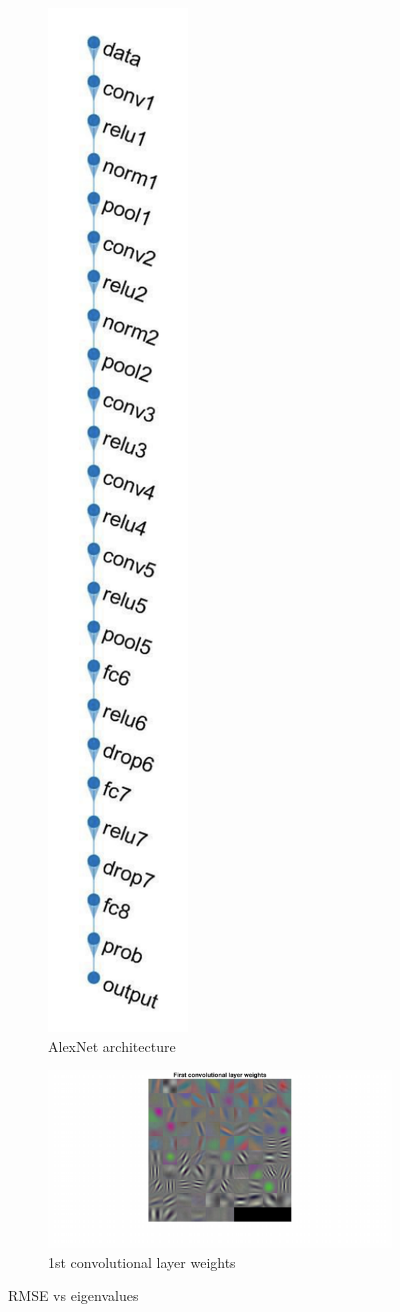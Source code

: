 \documentclass{article}
\begin{document}
\begin{figure}[h!]
\begin{subfigure}[b]{.49\textwidth}
  \centering
  \includegraphics[width=.15\linewidth]{lab3/alexnet.pdf}
  \caption{AlexNet architecture}
  \label{fig:alexnet}
\end{subfigure}
\hfill
\begin{subfigure}[b]{.49\textwidth}
  \centering
  \includegraphics[width=\linewidth]{lab3/1stclayer.pdf}
  \caption{1st convolutional layer weights}
  \label{fig:1stconvo}
\end{subfigure}
\caption{RMSE vs eigenvalues}
\label{fig:fig}
\end{figure}
\end{document}
